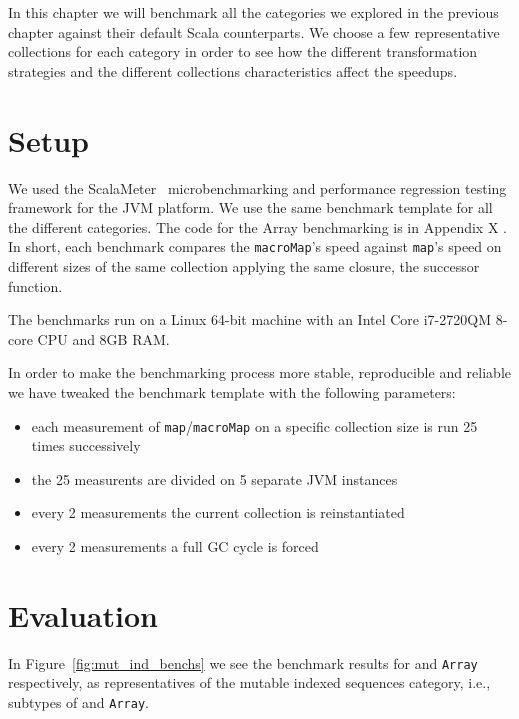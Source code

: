 \label{benchmarks}

In this chapter we will benchmark all the categories we explored in
the previous chapter against their default Scala counterparts. We choose a few
representative collections for each category in order to see how the different
transformation strategies and the different collections characteristics affect
the speedups.

\section{Setup}

We used the ScalaMeter~\cite{axel22:scalameter} microbenchmarking and performance regression
testing framework for the JVM platform. We use the same benchmark template for
all the different categories. The code for the Array benchmarking is in Appendix X
. In short, each benchmark compares the \texttt{macroMap}'s speed against \texttt{map}'s speed
on different sizes of the same collection applying the same closure, the
successor function.

The benchmarks run on a Linux 64-bit machine with an Intel Core i7-2720QM 8-core
CPU and 8GB RAM.

In order to make the benchmarking process more stable, reproducible and reliable
we have tweaked the benchmark template with the following parameters:

\begin{itemize}
 \item 
  each measurement of \texttt{map}/\texttt{macroMap} on a specific collection size is run 25
times successively
 \item
  the 25 measurents are divided on 5 separate JVM instances
 \item
  every 2 measurements the current collection is reinstantiated
 \item
  every 2 measurements a full GC cycle is forced
\end{itemize}


\section{Evaluation}

In Figure~\ref{fig:mut_ind_benchs} we see the benchmark results for  
and \texttt{Array} respectively, as representatives of the mutable indexed
sequences category, i.e., subtypes of  and
\texttt{Array}.


